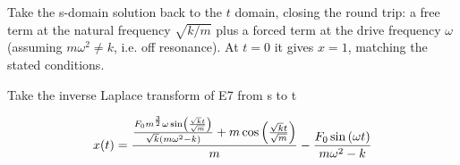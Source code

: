 \documentclass[dvipdfmx]{article}
\begin{document}
Take the s-domain solution back to the $t$ domain, closing the round trip: a free term at the natural frequency $\sqrt{k/m}$ plus a forced term at the drive frequency $\omega$ (assuming $m\omega^2 \ne k$, i.e. off resonance). At $t=0$ it gives $x=1$, matching the stated conditions.

Take the inverse Laplace transform of E7 from s to t

\begin{equation}
  x(t) = {{{{F_{0} m^{\frac{3}{2}} \omega \sin \left(\frac{\sqrt{k} t}{\sqrt{m}}\right)}\over{\sqrt{k} \left(m \omega^2-k\right)}}+m \cos \left(\frac{\sqrt{k} t}{\sqrt{m}}\right)}\over{m}}-\frac{F_{0} \sin \left(\omega t\right)}{m \omega^2-k}
  \label{eq:E8}
\end{equation}
\end{document}
